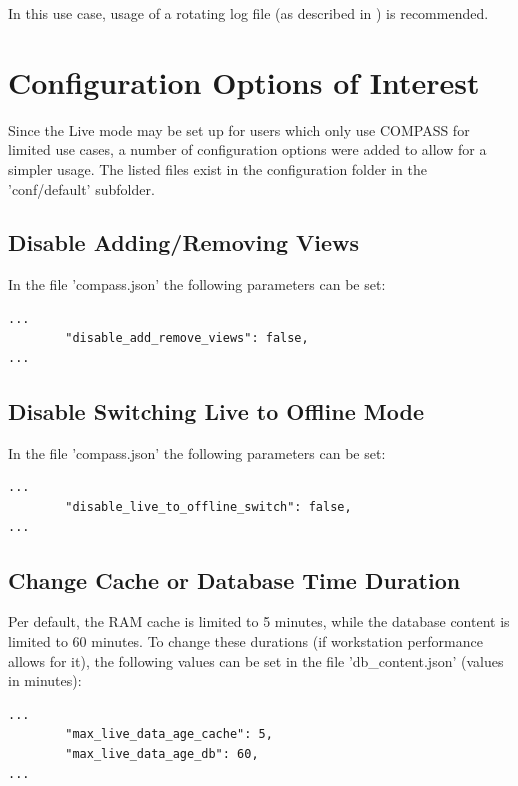 In this use case, usage of a rotating log file (as described in ) is recommended.

\section{Configuration Options of Interest}

Since the Live mode may be set up for users which only use COMPASS for limited use cases, a number of configuration options were added to allow for a simpler usage. The listed files exist in the configuration folder in the 'conf/default' subfolder.

\subsection{Disable Adding/Removing Views}

In the file 'compass.json' the following parameters can be set:

\begin{lstlisting}
...
        "disable_add_remove_views": false,
...        
\end{lstlisting}

\subsection{Disable Switching Live to Offline Mode}

In the file 'compass.json' the following parameters can be set:

\begin{lstlisting}
...
        "disable_live_to_offline_switch": false,
...        
\end{lstlisting}

\subsection{Change Cache or Database Time Duration}

Per default, the RAM cache is limited to 5 minutes, while the database content is limited to 60 minutes. To change these durations (if workstation performance allows for it), the following values can be set in the file 'db\_content.json' (values in minutes):

\begin{lstlisting}
...
        "max_live_data_age_cache": 5,
        "max_live_data_age_db": 60,
...        
\end{lstlisting}

